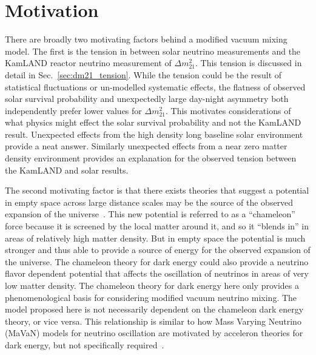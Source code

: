 \section{Motivation}
\label{sec:motivations}
There are broadly two motivating factors behind a modified vacuum mixing model.
The first is the tension in between solar neutrino measurements and 
the KamLAND reactor neutrino measurement of $\Delta m^{2}_{21}$.
This tension is discussed in detail in Sec.~\ref{sec:dm21_tension}.
While the tension could be the result of statistical fluctuations or un-modelled
systematic effects, the flatness of observed solar survival probability and
unexpectedly large day-night asymmetry both independently prefer lower values
for $\Delta m^{2}_{21}$.
This motivates considerations of what physics might effect the solar survival
probability and not the KamLAND result.
Unexpected effects from the high density long baseline solar environment provide a neat answer.
Similarly unexpected effects from a near zero matter density environment
provides an explanation for the observed tension between the KamLAND and solar
results.

The second motivating factor is that there exists theories that
suggest a potential in empty space across large distance scales may be the source
of the observed expansion of the universe~\citep{khoury_chameleons}.
This new potential is referred to as a ``chameleon'' force because it
is screened by the local matter around it, and so it ``blends in'' in
areas of relatively high matter density.
But in empty space the potential is much stronger and thus able to provide
a source of energy for the observed expansion of the universe.
The chameleon theory for dark energy could also provide a neutrino flavor dependent
potential that affects the oscillation of neutrinos in areas of very low matter
density.
The chameleon theory for dark energy here only provides a phenomenological basis
for considering modified vacuum neutrino mixing. The model proposed here is
not necessarily dependent on the chameleon dark energy theory, or vice versa.
This relationship is similar to how Mass Varying Neutrino (MaVaN) models
for neutrino oscillation are motivated by acceleron theories for dark energy,
but not specifically required~\citep{mavans_cosmology}.


